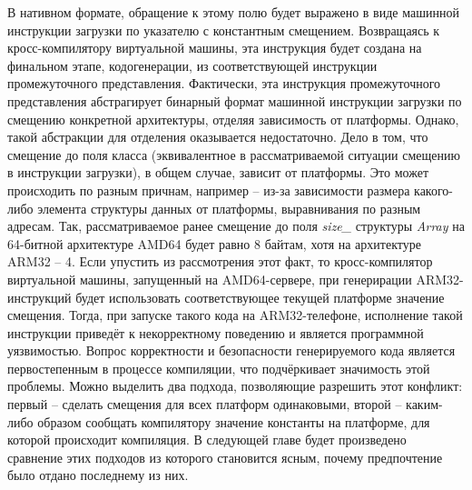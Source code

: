 В нативном формате, обращение к этому полю будет выражено в виде машинной инструкции загрузки по указателю с константным смещением.
Возвращаясь к кросс-компилятору виртуальной машины, эта инструкция будет создана на финальном этапе, кодогенерации, из соответствующей инструкции промежуточного представления.
Фактически, эта инструкция промежуточного представления абстрагирует бинарный формат машинной инструкции загрузки по смещению конкретной архитектуры, отделяя зависимость от платформы.
Однако, такой абстракции для отделения оказывается недостаточно.
Дело в том, что смещение до поля класса (эквивалентное в рассматриваемой ситуации смещению в инструкции загрузки), в общем случае, зависит от платформы.
Это может происходить по разным причнам, например -- из-за зависимости размера какого-либо элемента структуры данных от платформы, выравнивания по разным адресам.
Так, рассматриваемое ранее смещение до поля \textit{size\_} структуры \textit{Array} на 64-битной архитектуре AMD64 будет равно 8 байтам, хотя на архитектуре ARM32 -- 4.
Если упустить из рассмотрения этот факт, то кросс-компилятор виртуальной машины, запущенный на AMD64-сервере, при генерирации ARM32-инструкций будет использовать соответствующее текущей платформе значение смещения.
Тогда, при запуске такого кода на ARM32-телефоне, исполнение такой инструкции приведёт к некорректному поведению и является программной уязвимостью.
Вопрос корректности и безопасности генерируемого кода является первостепенным в процессе компиляции, что подчёркивает значимость этой проблемы.
Можно выделить два подхода, позволяющие разрешить этот конфликт: первый -- сделать смещения для всех платформ одинаковыми, второй -- каким-либо образом сообщать компилятору значение константы на платформе, для которой происходит компиляция. В следующей главе будет произведено сравнение этих подходов из которого становится ясным, почему предпочтение было отдано последнему из них. 

\newpage
